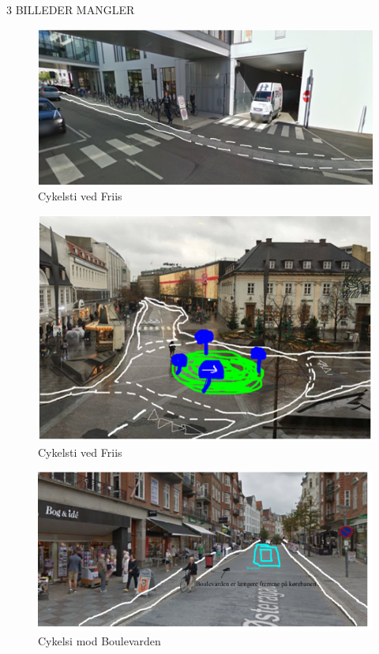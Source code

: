 {3 BILLEDER MANGLER
\begin{figure}[htbp]
   \label{fig:Cykelsti}
   \centering
   \begin{adjustbox}{max width=\textwidth}
     \includegraphics[scale=0.2]{billederogfigur/ved_friis.png}
  \end{adjustbox}
   \caption{Cykelsti ved Friis}
 \end{figure}

\begin{figure}[htbp]
   \label{fig:Cykelsti_ved_Friis}
   \centering
   \begin{adjustbox}{max width=\textwidth}
     \includegraphics[scale=0.2]{billederogfigur/cykelsti_ved_mac.png}
  \end{adjustbox}
   \caption{Cykelsti ved Friis}
 \end{figure}

\begin{figure}[htbp]
   \label{fig:Cykelsti_mod_Boulevarden}
   \centering
   \begin{adjustbox}{max width=\textwidth}
     \includegraphics[scale=0.2]{billederogfigur/bogogide.png}
  \end{adjustbox}
   \caption{Cykelsi mod Boulevarden}
 \end{figure}


}
